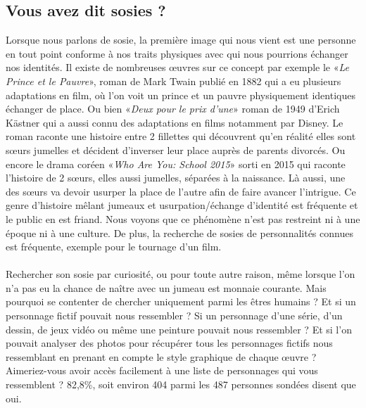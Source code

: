 \documentclass[a4paper,12pt]{article}
\begin{document}
\subsection{Vous avez dit sosies ?}
Lorsque nous parlons de sosie, la première image qui nous vient est une personne en tout point conforme à nos traits physiques avec qui nous pourrions échanger nos identités. Il existe de nombreuses œuvres sur ce concept par exemple le «\textit{Le Prince et le Pauvre}», roman de Mark Twain publié en 1882 qui a eu plusieurs adaptations en film, où l'on voit un prince et un pauvre physiquement identiques échanger de place. Ou bien «\textit{Deux pour le prix d'une}» roman de 1949 d'Erich Kästner qui a aussi connu des adaptations en films notamment par Disney. Le roman raconte une histoire entre 2 fillettes qui découvrent qu'en réalité elles sont sœurs jumelles et décident d'inverser leur place auprès de parents divorcés. Ou encore le drama coréen «\textit{Who Are You: School 2015}» sorti en 2015 qui raconte l'histoire de 2 sœurs, elles aussi jumelles, séparées à la naissance. Là aussi, une des sœurs va devoir usurper la place de l'autre afin de faire avancer l'intrigue. Ce genre d'histoire mêlant jumeaux et usurpation/échange d'identité est fréquente et le public en est friand. Nous voyons que ce phénomène n'est pas restreint ni à une époque ni à une culture. De plus, la recherche de sosies de personnalités connues est fréquente, exemple pour le tournage d'un film. 
\\ \\
Rechercher son sosie par curiosité, ou pour toute autre raison, même lorsque l'on n'a pas eu la chance de naître avec un jumeau est monnaie courante. Mais pourquoi se contenter de chercher uniquement parmi les êtres humains ? Et si un personnage fictif pouvait nous ressembler ? Si un personnage d'une série, d'un dessin, de jeux vidéo ou même une peinture pouvait nous ressembler ? Et si l'on pouvait analyser des photos pour récupérer tous les personnages fictifs nous ressemblant en prenant en compte le style graphique de chaque œuvre ? Aimeriez-vous avoir accès facilement à une liste de personnages qui vous ressemblent ? 82,8\%, soit environ 404 parmi les 487 personnes sondées disent que oui. 
\end{document}
